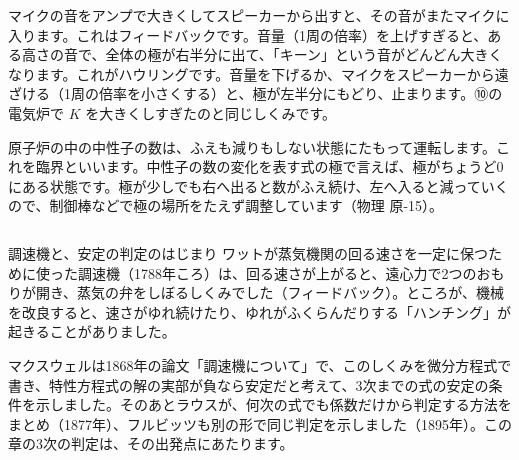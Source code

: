 \begin{butsuri}
\noindent\begin{minipage}[c]{0.62\linewidth}
\raggedright
マイクの音をアンプで大きくしてスピーカーから出すと、その音がまたマイクに入ります。これはフィードバックです。音量（1周の倍率）を上げすぎると、ある高さの音で、全体の極が右半分に出て、「キーン」という音がどんどん大きくなります。これがハウリングです。音量を下げるか、マイクをスピーカーから遠ざける（1周の倍率を小さくする）と、極が左半分にもどり、止まります。⑩の電気炉で $K$ を大きくしすぎたのと同じしくみです。
\end{minipage}\hfill
\begin{minipage}[c]{0.35\linewidth}
\centering
{}
\end{minipage}\par\vspace{4pt}

原子炉の中の中性子の数は、ふえも減りもしない状態にたもって運転します。これを臨界といいます。中性子の数の変化を表す式の極で言えば、極がちょうど0にある状態です。極が少しでも右へ出ると数がふえ続け、左へ入ると減っていくので、制御棒などで極の場所をたえず調整しています（物理 原-15）。
\end{butsuri}


\begin{column}{調速機と、安定の判定のはじまり}
ワットが蒸気機関の回る速さを一定に保つために使った調速機（1788年ころ）は、回る速さが上がると、遠心力で2つのおもりが開き、蒸気の弁をしぼるしくみでした（フィードバック）。ところが、機械を改良すると、速さがゆれ続けたり、ゆれがふくらんだりする「ハンチング」が起きることがありました。

マクスウェルは1868年の論文「調速機について」で、このしくみを微分方程式で書き、特性方程式の解の実部が負なら安定だと考えて、3次までの式の安定の条件を示しました。そのあとラウスが、何次の式でも係数だけから判定する方法をまとめ（1877年）、フルビッツも別の形で同じ判定を示しました（1895年）。この章の3次の判定は、その出発点にあたります。
\end{column}


